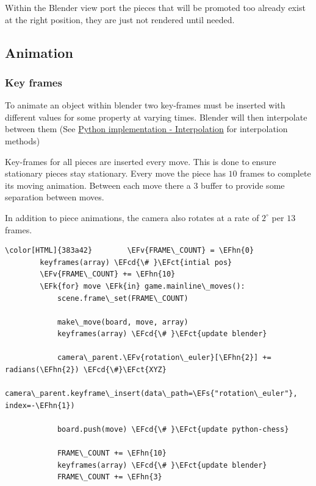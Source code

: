 \documentclass[11pt]{article}
\newcommand{\EFk}[1]{\textcolor{EFk}{#1}} %
\newcommand{\EFs}[1]{\textcolor{EFs}{#1}} %
\newcommand{\EFct}[1]{\textcolor{EFct}{#1}} %
\newcommand{\EFv}[1]{\textcolor{EFv}{#1}} %
\newcommand{\EFcd}[1]{\textcolor{EFcd}{#1}} %
\newcommand{\EFhn}[1]{\textcolor{EFhn}{\textbf{#1}}} %
\begin{document}
Within the Blender view port the pieces that will be promoted too already exist
at the right position, they are just not rendered until needed.
\subsection{Animation}
\label{sec:org4ec1854}
\subsubsection{Key frames}
\label{sec:org4241d8e}
To animate an object within blender two key-frames must be inserted with
different values for some property at varying times. Blender will then
interpolate between them (See \hyperref[sec:org22cd1d2]{Python implementation - Interpolation} for
interpolation methods)

Key-frames for all pieces are inserted every move. This is done to ensure
stationary pieces stay stationary. Every move the piece has \(10\) frames to
complete its moving animation. Between each move there a \(3\) buffer to provide
some separation between moves.

In addition to piece animations, the camera also rotates at a rate of
\(2^{\circ}\) per \(13\) frames.
\begin{Code}
\begin{Verbatim}[]
\color[HTML]{383a42}        \EFv{FRAME\_COUNT} = \EFhn{0}
        keyframes(array) \EFcd{\# }\EFct{intial pos}
        \EFv{FRAME\_COUNT} += \EFhn{10}
        \EFk{for} move \EFk{in} game.mainline\_moves():
            scene.frame\_set(FRAME\_COUNT)

            make\_move(board, move, array)
            keyframes(array) \EFcd{\# }\EFct{update blender}

            camera\_parent.\EFv{rotation\_euler}[\EFhn{2}] += radians(\EFhn{2}) \EFcd{\#}\EFct{XYZ}
            camera\_parent.keyframe\_insert(data\_path=\EFs{"rotation\_euler"}, index=-\EFhn{1})

            board.push(move) \EFcd{\# }\EFct{update python-chess}

            FRAME\_COUNT += \EFhn{10}
            keyframes(array) \EFcd{\# }\EFct{update blender}
            FRAME\_COUNT += \EFhn{3}
\end{Verbatim}
\end{Code}
\end{document}
